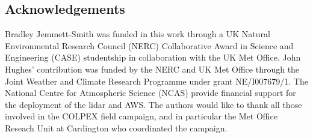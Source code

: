 \documentclass[times]{qjrms4}
\begin{document}
\subsection{Acknowledgements}
Bradley Jemmett-Smith was funded in this work through a UK Natural Environmental Research Council (NERC) Collaborative Award in Science and Engineering (CASE) studentship in collaboration with the UK Met Office. John Hughes' contribution was funded by the NERC and UK Met Office through the Joint Weather and Climate Research Programme under grant NE/I007679/1. The National Centre for Atmospheric Science (NCAS) provide financial support for the deployment of the lidar and AWS. The authors would like to thank all those involved in the COLPEX field campaign, and in particular the Met Office Reseach Unit at Cardington who coordinated the campaign.
\end{document}

